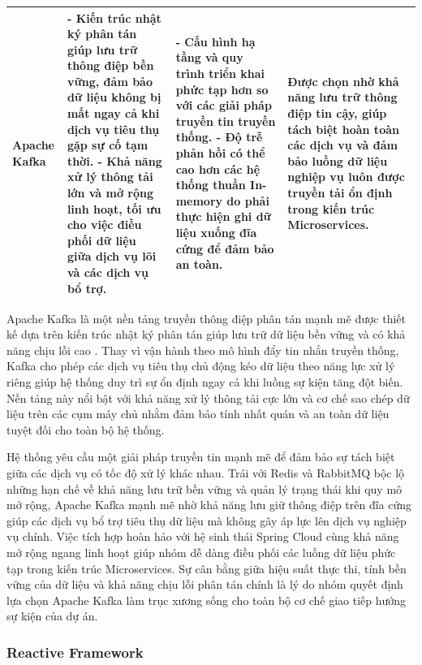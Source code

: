 \begin{center}
\begin{longtable}{|p{2.5cm}|p{4cm}|p{4cm}|p{3.5cm}|}
Apache Kafka & 
- Kiến trúc nhật ký phân tán giúp lưu trữ thông điệp bền vững, đảm bảo dữ liệu không bị mất ngay cả khi dịch vụ tiêu thụ gặp sự cố tạm thời. \newline 
- Khả năng xử lý thông tải lớn và mở rộng linh hoạt, tối ưu cho việc điều phối dữ liệu giữa dịch vụ lõi và các dịch vụ bổ trợ. & 
- Cấu hình hạ tầng và quy trình triển khai phức tạp hơn so với các giải pháp truyền tin truyền thống. \newline 
- Độ trễ phản hồi có thể cao hơn các hệ thống thuần In-memory do phải thực hiện ghi dữ liệu xuống đĩa cứng để đảm bảo an toàn. & 
Được chọn nhờ khả năng lưu trữ thông điệp tin cậy, giúp tách biệt hoàn toàn các dịch vụ và đảm bảo luồng dữ liệu nghiệp vụ luôn được truyền tải ổn định trong kiến trúc Microservices. \\ \hline

\end{longtable}
\end{center} 

\vspace{-40pt}

Apache Kafka là một nền tảng truyền thông điệp phân tán mạnh mẽ được thiết kế dựa trên kiến trúc nhật ký phân tán giúp lưu trữ dữ liệu bền vững và có khả năng chịu lỗi cao \cite{kafka}. Thay vì vận hành theo mô hình đẩy tin nhắn truyền thống, Kafka cho phép các dịch vụ tiêu thụ chủ động kéo dữ liệu theo năng lực xử lý riêng giúp hệ thống duy trì sự ổn định ngay cả khi luồng sự kiện tăng đột biến. Nền tảng này nổi bật với khả năng xử lý thông tải cực lớn và cơ chế sao chép dữ liệu trên các cụm máy chủ nhằm đảm bảo tính nhất quán và an toàn dữ liệu tuyệt đối cho toàn bộ hệ thống.

Hệ thống yêu cầu một giải pháp truyền tin mạnh mẽ để đảm bảo sự tách biệt giữa các dịch vụ có tốc độ xử lý khác nhau. Trái với Redis và RabbitMQ bộc lộ những hạn chế về khả năng lưu trữ bền vững và quản lý trạng thái khi quy mô mở rộng, Apache Kafka mạnh mẽ nhờ khả năng lưu giữ thông điệp trên đĩa cứng giúp các dịch vụ bổ trợ tiêu thụ dữ liệu mà không gây áp lực lên dịch vụ nghiệp vụ chính. Việc tích hợp hoàn hảo với hệ sinh thái Spring Cloud cùng khả năng mở rộng ngang linh hoạt giúp nhóm dễ dàng điều phối các luồng dữ liệu phức tạp trong kiến trúc Microservices. Sự cân bằng giữa hiệu suất thực thi, tính bền vững của dữ liệu và khả năng chịu lỗi phân tán chính là lý do nhóm quyết định lựa chọn Apache Kafka làm trục xương sống cho toàn bộ cơ chế giao tiếp hướng sự kiện của dự án.

\subsubsection{Reactive Framework}

